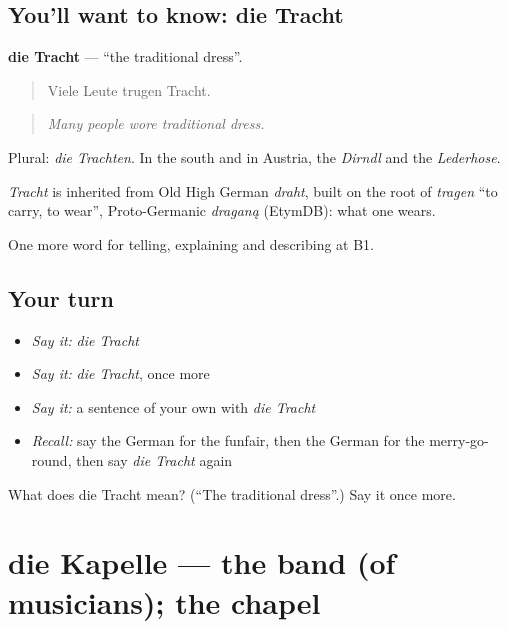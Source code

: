 \subsection*{You'll want to know: die Tracht}
\textbf{die Tracht} — \textquotedblleft{}the traditional dress\textquotedblright{}.

\begin{quote}
Viele Leute trugen Tracht.
\end{quote}

\begin{quote}
\emph{Many people wore traditional dress.}
\end{quote}

Plural: \emph{die Trachten}. In the south and in Austria, the \emph{Dirndl} and the \emph{Lederhose}.

\begin{cousinweb}
\emph{Tracht} is inherited from Old High German \emph{draht}, built on the root of \emph{tragen} \textquotedblleft{}to carry, to wear\textquotedblright{}, Proto-Germanic \emph{draganą} (EtymDB): what one wears.
\end{cousinweb}

\begin{grammarlens}[title={What you've built}]
One more word for telling, explaining and describing at B1.
\end{grammarlens}

\subsection*{Your turn}
\begin{itemize}
\raggedright
  \item \emph{Say it:} \emph{die Tracht}
  \item \emph{Say it:} \emph{die Tracht}, once more
  \item \emph{Say it:} a sentence of your own with \emph{die Tracht}
  \item \emph{Recall:} say the German for the funfair, then the German for the merry-go-round, then say \emph{die Tracht} again
\end{itemize}

\begin{tcolorbox}[breakable,colback=teal!4,colframe=teal!35!black,title={Before you move on}]
What does die Tracht mean? (\textquotedblleft{}The traditional dress\textquotedblright{}.) Say it once more.
\end{tcolorbox}
\section[die Kapelle]{die Kapelle — the band (of musicians); the chapel}

